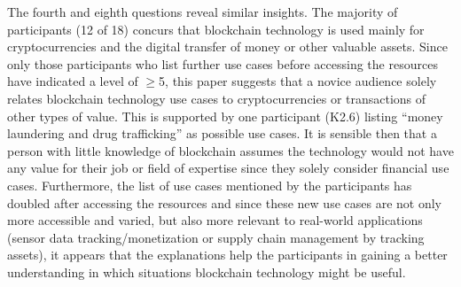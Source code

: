 The fourth and eighth questions reveal similar insights. The majority of participants (12 of 18) concurs that blockchain technology is used mainly for cryptocurrencies and the digital transfer of money or other valuable assets. Since only those participants who list further use cases before accessing the resources have indicated a level of $\geq$5, this paper suggests that a novice audience solely relates blockchain technology use cases to cryptocurrencies or transactions of other types of value. This is supported by one participant (K2.6) listing \enquote{money laundering and drug trafficking} as possible use cases. It is sensible then that a person with little knowledge of blockchain assumes the technology would not have any value for their job or field of expertise since they solely consider financial use cases. Furthermore, the list of use cases mentioned by the participants has doubled after accessing the resources and since these new use cases are not only more accessible and varied, but also more relevant to real-world applications (sensor data tracking/monetization or supply chain management by tracking assets), it appears that the explanations help the participants in gaining a better understanding in which situations blockchain technology might be useful.

